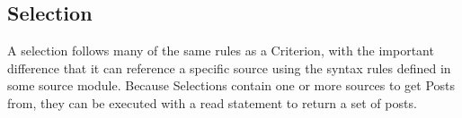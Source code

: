 \subsection{Selection}
A selection follows many of the same rules as a Criterion, with the important difference that it can
reference a specific source using the syntax rules defined in some source module. Because Selections
contain one or more sources to get Posts from, they can be executed with a read statement to return a
set of posts.
